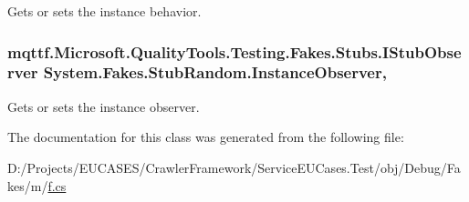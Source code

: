 Gets or sets the instance behavior.

\hypertarget{class_system_1_1_fakes_1_1_stub_random_a741de87714840cb0fb7df59c6544f17b}{
\subsubsection[{Instance\-Observer}]{\setlength{\rightskip}{0pt plus 5cm}mqttf.\-Microsoft.\-Quality\-Tools.\-Testing.\-Fakes.\-Stubs.\-I\-Stub\-Observer System.\-Fakes.\-Stub\-Random.\-Instance\-Observer\hspace{0.3cm}{\ttfamily [get]}, {\ttfamily [set]}}}\label{class_system_1_1_fakes_1_1_stub_random_a741de87714840cb0fb7df59c6544f17b}


Gets or sets the instance observer.



The documentation for this class was generated from the following file\-:\begin{DoxyCompactItemize}
\item 
D\-:/\-Projects/\-E\-U\-C\-A\-S\-E\-S/\-Crawler\-Framework/\-Service\-E\-U\-Cases.\-Test/obj/\-Debug/\-Fakes/m/\hyperlink{m_2f_8cs}{f.\-cs}\end{DoxyCompactItemize}
